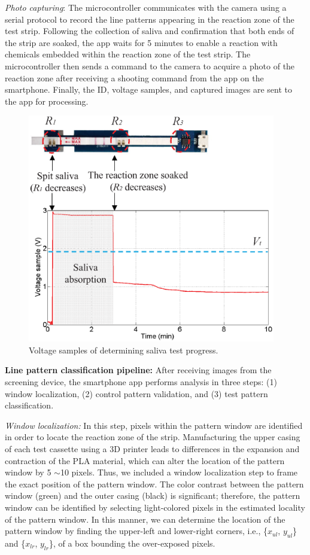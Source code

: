 \emph{Photo capturing}: The microcontroller communicates with the camera using a serial protocol to record the line patterns appearing in the reaction zone of the test strip. Following the collection of saliva and confirmation that both ends of the strip are soaked, the app waits for 5 minutes to enable a reaction with chemicals embedded within the reaction zone of the test strip. The microcontroller then sends a command to the camera to acquire a photo of the reaction zone after receiving a shooting command from the app on the smartphone. 
Finally, the ID, voltage samples, and captured images are sent to the app for processing.

\begin{figure}[ht]
\begin{center}
\includegraphics[height=10cm]{image/ket/saliva_absorb.eps}
\caption{Voltage samples of determining saliva test progress.}
\label{fig:saliva_absorb}
\end{center}
\end{figure}


\textbf{Line pattern classification pipeline:}
\newline
After receiving images from the screening device, the smartphone app performs analysis in three steps: (1) window localization, (2) control pattern validation, and (3) test pattern classification.

\emph{Window localization: }
In this step, pixels within the pattern window are identified in order to locate the reaction zone of the strip. Manufacturing the upper casing of each test cassette using a 3D printer leads to differences in the expansion and contraction of the PLA material, which can alter the location of the pattern window by 5 $\sim$10 pixels. Thus, we included a window localization step to frame the exact position of the pattern window. The color contrast between the pattern window (green) and the outer casing (black) is significant; therefore, the pattern window can be identified by selecting light-colored pixels in the estimated locality of the pattern window. In this manner, we can determine the location of the pattern window by finding the upper-left and lower-right corners, i.e., \{$x_{ul}$, $y_{ul}$\} and \{$x_{lr}$, $y_{lr}$\}, of a box bounding the over-exposed pixels.

